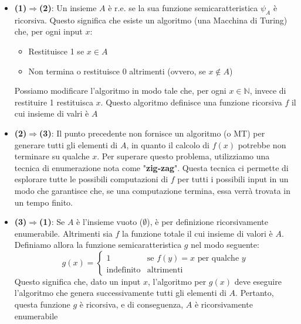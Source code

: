 \documentclass[12pt, a4paper]{report}
\begin{document}
                    \begin{demonstration}
                        \begin{itemize}
                            \item \textbf{(1)$\Rightarrow$(2)}: Un insieme $A$ è r.e. se la sua funzione semicaratteristica $\psi_A$ è ricorsiva. Questo significa che esiste un algoritmo (una Macchina di Turing) che, per ogni input $x$: \begin{itemize}
                                \item Restituisce 1 se $x \in A$
                                \item Non termina o restituisce 0 altrimenti (ovvero, se $x \notin A$)
                            \end{itemize}
                            Possiamo modificare l'algoritmo in modo tale che, per ogni $x\in\mathbb{N}$, invece di restituire 1  restituisca $x$. Questo algoritmo definisce una funzione ricorsiva $f$ il cui insieme di valri è $A$
                            \item \textbf{(2)$\Rightarrow$(3)}: Il punto precedente non fornisce un algoritmo (o MT) per generare tutti gli elementi di $A$, in quanto il calcolo di $f(x)$ potrebbe non terminare su qualche $x$. Per superare questo problema, utilizziamo una tecnica di enumerazione nota come "\textbf{zig-zag}". Questa tecnica ci permette di esplorare tutte le possibili computazioni di $f$ per tutti i possibili input in un modo che garantisce che, se una computazione termina, essa verrà trovata in un tempo finito.
                            \item \textbf{(3)$\Rightarrow$(1)}: Se $A$ è l'insieme vuoto ($\emptyset$), è per definizione ricorsivamente enumerabile. Altrimenti sia $f$ la funzione totale il cui insieme di valori è $A$. Definiamo allora la funzione semicaratteristica $g$ nel modo seguente: $$g(x)=\begin{cases}
                                1 & \text{se } f(y)=x \text{ per qualche } y\\
                                \text{indefinito} & \text{altrimenti}
                            \end{cases}$$ Questo significa che, dato un input $x$, l'algoritmo per $g(x)$ deve eseguire l'algoritmo che genera successivamente tutti gli elementi di $A$. Pertanto, questa funzione $g$ è ricorsiva, e di conseguenza, $A$ è ricorsivamente enumerabile
                        \end{itemize}
                    \end{demonstration}
\end{document}
